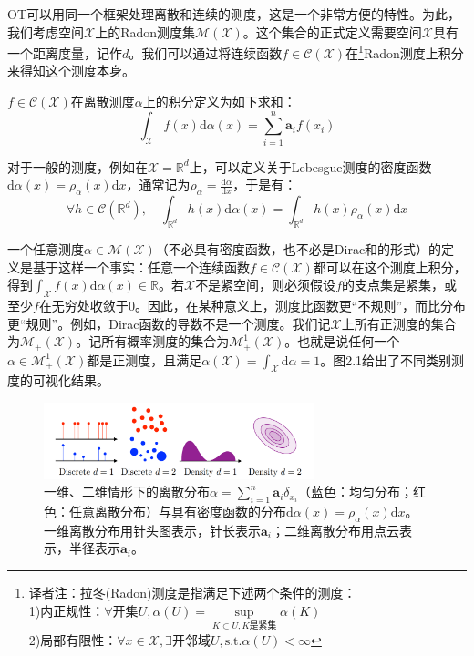 \documentclass[cn,10pt,math=newtx,citestyle=gb7714-2015,bibstyle=gb7714-2015]{elegantbook}
\begin{document}
\begin{postulate}[一般测度]

OT可以用同一个框架处理离散和连续的测度，这是一个非常方便的特性。为此，我们考虑空间$\mathcal{X}$上的Radon测度集$\mathcal{M(X)}$。这个集合的正式定义需要空间$\mathcal{X}$具有一个距离度量，记作$d$。我们可以通过将连续函数$f\in\mathcal{C(X)}$在\footnote{译者注：拉冬(Radon)测度是指满足下述两个条件的测度：\\1)内正规性：$\forall\text{开集}U,\alpha(U)=\sup\limits_{K\subset U,K\text{是紧集}}\alpha(K)$\\2)局部有限性：$\forall x\in \mathcal{X},\exists \text{开邻域}U,\text{s.t.} \alpha(U)<\infty$}Radon测度上积分来得知这个测度本身。

$f\in\mathcal{C(X)}$在离散测度$\alpha$上的积分定义为如下求和：
\begin{equation*}
    \int_\mathcal{X} f(x)\text{d} \alpha(x)=\sum_{i=1}^n \mathbf{a}_if(x_i)
\end{equation*}

对于一般的测度，例如在$\mathcal{X}=\mathbb{R}^d$上，可以定义关于Lebesgue测度的密度函数$\text{d} \alpha(x)=\rho_\alpha(x)\text{d}x$，通常记为$\rho_\alpha=\frac{\text{d} \alpha}{\text{d} x}$，于是有：
\begin{equation*}
    \forall h\in\mathcal{C}(\mathbb{R}^d),\quad \int_{\mathbb{R}^d}h(x)\text{d}\alpha(x)=\int_{\mathbb{R}^d}h(x)\rho_\alpha(x)\text{d}x
\end{equation*}

一个任意测度$\alpha\in\mathcal{M(X)}$（不必具有密度函数，也不必是Dirac和的形式）的定义是基于这样一个事实：任意一个连续函数$f\in\mathcal{C(X)}$都可以在这个测度上积分，得到$\int_\mathcal{X} f(x)\text{d}\alpha(x)\in\mathbb{R}$。若$\mathcal{X}$不是紧空间，则必须假设$f$的支点集是紧集，或至少$f$在无穷处收敛于$0$。因此，在某种意义上，测度比函数更“不规则”，而比分布更“规则”。例如，Dirac函数的导数不是一个测度。我们记$\mathcal{X}$上所有正测度的集合为$\mathcal{M_+(X)}$。记所有概率测度的集合为$\mathcal{M}^1_+(\mathcal{X})$。也就是说任何一个$\alpha\in\mathcal{M}^1_+(\mathcal{X})$都是正测度，且满足$\alpha(\mathcal{X})=\int_\mathcal{X}\text{d}\alpha=1$。图2.1给出了不同类别测度的可视化结果。

\end{postulate}

\begin{figure}[H]
    \centering
    \includegraphics[width=0.7\textwidth]{figure/fig2.1.png}
    \caption{一维、二维情形下的离散分布$\alpha=\sum_{i=1}^n \mathbf{a}_i\delta_{x_i}$（蓝色：均匀分布；红色：任意离散分布）与具有密度函数的分布$\text{d} \alpha(x)=\rho_\alpha(x)\text{d}x$。一维离散分布用针头图表示，针长表示$\mathbf{a}_i$；二维离散分布用点云表示，半径表示$\mathbf{a}_i$。}
    \label{图2.1}
\end{figure}
\end{document}
